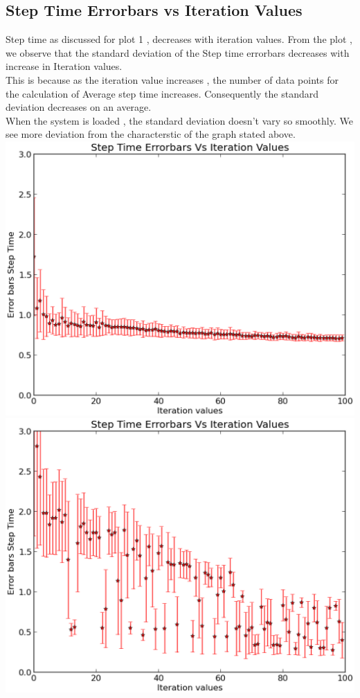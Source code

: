 \documentclass[a4paper,11pt]{report}
\begin{document}
\subsection{Step Time Errorbars vs Iteration Values} 
Step time as discussed for plot 1 , decreases with iteration values. From the plot , we observe that the standard deviation of the Step time errorbars decreases with increase in Iteration values.\\
This is because as the iteration value increases , the number of data points for the calculation of Average step time increases. Consequently the standard deviation decreases on an average.\\
When the system is loaded , the standard deviation  doesn't vary so smoothly. We see more deviation from the characterstic of the graph stated above.\\
\includegraphics[scale=.3]{doc/g12_plot05.eps}
\includegraphics[scale=.3]{doc/g12_plotload05.eps} \\
\end{document}
